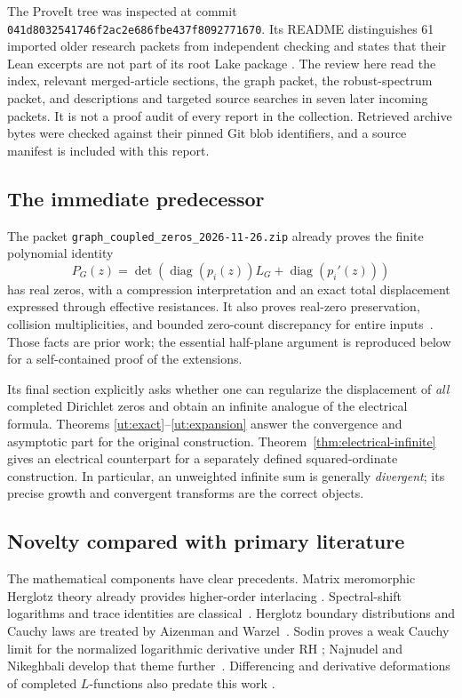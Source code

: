 The ProveIt tree was inspected at commit
\texttt{041d8032541746f2ac2e686fbe437f8092771670}.  Its README distinguishes
61 imported older research packets from independent checking and states
that their Lean excerpts are not part of its root Lake package
\cite{proveit}.  The review here read the index, relevant merged-article
sections, the graph packet, the robust-spectrum packet, and descriptions
and targeted source searches in seven later incoming packets.  It is
not a proof audit of every report in the collection.  Retrieved archive
bytes were checked against their pinned Git blob identifiers, and a
source manifest is included with this report.

\subsection{The immediate predecessor}

The packet \texttt{graph\_coupled\_zeros\_2026-11-26.zip} already proves
the finite polynomial identity
\[
 P_G(z)=\det\!\left(\operatorname{diag}(p_i(z))L_G+
                             \operatorname{diag}(p_i'(z))\right)
\]
has real zeros, with a compression interpretation and an exact total
displacement expressed through effective resistances.  It also proves
real-zero preservation, collision multiplicities, and bounded zero-count
discrepancy for entire inputs~\cite{priorgraph}.  Those facts are prior
work; the essential half-plane argument is reproduced below for a
self-contained proof of the extensions.

Its final section explicitly asks whether one can regularize the
displacement of \emph{all} completed Dirichlet zeros and obtain an
infinite analogue of the electrical formula.  Theorems
\ref{ut:exact}--\ref{ut:expansion} answer the convergence and asymptotic
part for the original construction.  Theorem~\ref{thm:electrical-infinite}
gives an electrical counterpart for a separately defined squared-ordinate
construction.  In particular, an unweighted infinite sum is generally
\emph{divergent}; its precise growth and convergent transforms are the
correct objects.

\subsection{Novelty compared with primary literature}

The mathematical components have clear precedents.  Matrix meromorphic
Herglotz theory already provides higher-order interlacing
\cite{reiffenstein}.  Spectral-shift logarithms and trace identities are
classical~\cite{bgn}.  Herglotz boundary distributions and Cauchy laws are
treated by Aizenman and Warzel~\cite{aizenmanwarzel}.  Sodin proves a weak
Cauchy limit for the normalized logarithmic derivative under RH
\cite[Section 3.4.5, equation (55)]{sodin}; Najnudel and Nikeghbali develop
that theme further~\cite{najnudel}.  Differencing and derivative
deformations of completed $L$-functions also predate this work
\cite{lagarias,farmergonek}.

